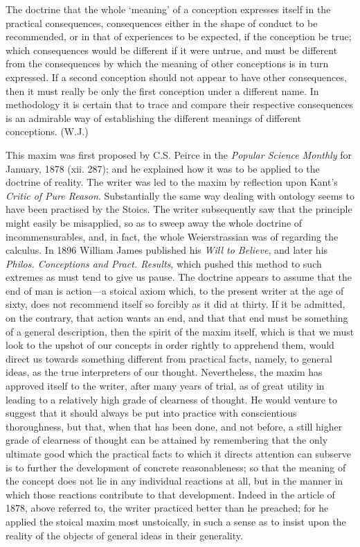 \documentclass{article}
\begin{document}
The doctrine that the whole `meaning' of a conception expresses itself in the practical consequences, consequences either in the shape of conduct to be recommended, or in that of experiences to be expected, if the conception be true; which consequences would be different if it were untrue, and must be different from the consequences by which the meaning of other conceptions is in turn expressed. If a second conception should not appear to have other consequences, then it must really be only the first conception under a different name. In methodology it is certain that to trace and compare their respective consequences is an admirable way of establishing the different meanings of different conceptions. \hfill (W.J.)


This maxim was first proposed by C.S. Peirce in the \textit{Popular Science Monthly} for January, 1878 (xii. 287); and he explained how it was to be applied to the doctrine of reality. The writer was led to the maxim by reflection upon Kant's \textit{Critic of Pure Reason}. Substantially the same way dealing with ontology seems to have been practised by the Stoics. The writer subsequently saw that the principle might easily be misapplied, so as to sweep away the whole doctrine of incommensurables, and, in fact, the whole Weierstrassian was of regarding the calculus. In 1896 William James published his \textit{Will to Believe}, and later his \textit{Philos. Conceptions and Pract. Results}, which pushed this method to such extremes as must tend to give us pause. The doctrine appears to assume that the end of man is action---a stoical axiom which, to the present writer at the age of sixty, does not recommend itself so forcibly as it did at thirty. If it be admitted, on the contrary, that action wants an end, and that that end must be something of a general description, then the spirit of the maxim itself, which is that we must look to the upshot of our concepts in order rightly to apprehend them, would direct us towards something different from practical facts, namely, to general ideas, as the true interpreters of our thought. Nevertheless, the maxim has approved itself to the writer, after many years of trial, as of great utility in leading to a relatively high grade of clearness of thought. He would venture to suggest that it should always be put into practice with conscientious thoroughness, but that, when that has been done, and not before, a still higher grade of clearness of thought can be attained by remembering that the only ultimate good which the practical facts to which it directs attention can subserve is to further the development of concrete reasonableness; so that the meaning of the concept does not lie in any individual reactions at all, but in the manner in which those reactions contribute to that development. Indeed in the article of 1878, above referred to, the writer practiced better than he preached; for he applied the stoical maxim most unstoically, in such a sense as to insist upon the reality of the objects of general ideas in their generality.
\end{document}
